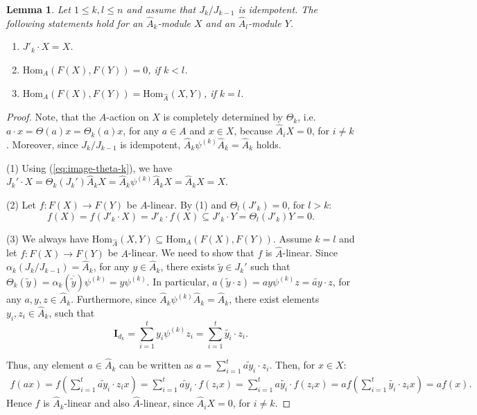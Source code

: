 \documentclass[oneside, a4paper, 11pt]{amsart}
\newtheorem{lemma}[theorem]{Lemma}
\newcommand{\asym}{\widehat{A}}
\newcommand{\Hom}{\mathrm{Hom}}
\begin{document}
\begin{lemma}\label{lem:idempotent} 
Let $1\leq k ,l \leq n$ and assume that $J_k/J_{k-1}$ is idempotent. The following statements hold for an $\asym_k$-module $X$ and an $\asym_l$-module $Y$.
\begin{enumerate}
    \item $J'_k\cdot X = X$.
    \item $\Hom_A(F(X),F(Y))=0$, if $k<l$.
    \item $\Hom_A(F(X),F(Y))=\Hom_{\asym}(X,Y)$, if $k=l$.
\end{enumerate}
\end{lemma}

\begin{proof}
Note, that the $A$-action on $X$ is completely determined by $\Theta_k$, i.e. $a\cdot x = \Theta(a)x = \Theta_k(a)x$, for any $a\in A$ and $x\in X$, because $\asym_iX=0$, for $i\neq k$.
Moreover, since $J_k/J_{k-1}$ is idempotent, $\asym_k\psi^{(k)}\asym_k=\asym_k$ holds.

(1) Using (\ref{eq:image-theta-k}), we have  $J_k' \cdot X= \Theta_k(J_k')\asym_k X =\asym_k\psi^{(k)}\asym_kX = \asym_k X = X.$

(2) Let $f:F(X)\to F(Y)$ be $A$-linear. By (1) and $\Theta_l(J'_k)=0$, for $l>k$:
$$f(X)=f(J'_k\cdot X)=J'_k\cdot f(X) \subseteq J'_k\cdot Y = \Theta_l(J'_k)Y=0.$$

(3) We always have $\Hom_{\asym}(X,Y)\subseteq \Hom_{A}(F(X),F(Y))$. Assume $k=l$ and let $f:F(X)\to F(Y)$ be  $A$-linear. We need to show that $f$ is $\asym$-linear. 
Since $\alpha_k(J_k/J_{k-1})=\asym_k$, for any $y \in \asym_k$, there exists $\tilde{y}\in J_k'$ such that
$\Theta_k(\tilde{y}) = \alpha_k(\overline{\tilde{y}})\psi^{(k)}=y\psi^{(k)}.$ In particular, $a(\tilde{y}\cdot z) = ay\psi^{(k)}z = \widetilde{ay}\cdot z$, for any $a,y,z\in \asym_k$.
Furthermore, since $\asym_k\psi^{(k)}\asym_k = \asym_k$, there exist elements $y_i, z_i\in \asym_k$, such that 
\begin{equation} \mathbf{I}_{d_k} 
    = \sum_{i=1}^t y_i \psi^{(k)} z_i
        =  \sum_{i=1}^t \tilde{y_i}\cdot z_i.\end{equation}

Thus, any element $a\in \asym_k$ can be written as $a=\sum_{i=1}^t \widetilde{ay_i}\cdot z_i$. Then, for $x\in X$:
\begin{eqnarray*}
    f(ax)
    = f\left(\sum_{i=1}^t \widetilde{ay_i} \cdot z_ix\right)
    = \sum_{i=1}^t \widetilde{ay_i} \cdot f ( z_ix )
    = \sum_{i=1}^t a \tilde{y_i}\cdot f ( z_ix )
    = a f\left(\sum_{i=1}^t \tilde{y_i}\cdot z_ix \right) = af(x).
\end{eqnarray*}
Hence $f$ is $\asym_k$-linear and also $\asym$-linear, since $\asym_i X = 0$, for $i\neq k$.
\end{proof}
\end{document}
